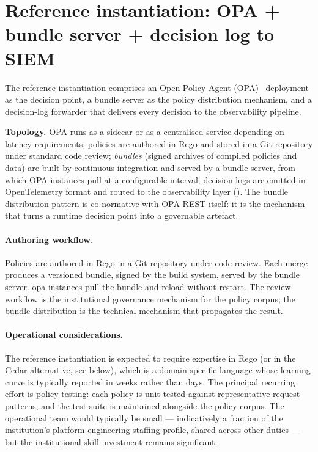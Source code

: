 \section{Reference instantiation: OPA + bundle server + decision log to SIEM}
\label{sec:po-reference}

The reference instantiation comprises an Open Policy Agent
(OPA)~\cite{opa-project}
deployment as the decision point, a bundle server as the policy
distribution mechanism, and a decision-log forwarder that delivers
every decision to the observability pipeline.

\begin{instantiationbox}
\noindent\textbf{Topology.} OPA runs as a sidecar or as a centralised
service depending on latency requirements; policies are authored in
Rego and stored in a Git repository under standard code review;
\emph{bundles} (signed archives of compiled policies and data) are
built by continuous integration and served by a bundle server, from
which OPA instances pull at a configurable interval; decision logs
are emitted in OpenTelemetry format and routed to the observability
layer (). The bundle distribution pattern
is co-normative with OPA REST itself: it is the mechanism that turns
a runtime decision point into a governable artefact.
\end{instantiationbox}

\paragraph{Authoring workflow.} Policies are authored in Rego in a
Git repository under code review. Each merge produces a versioned
bundle, signed by the build system, served by the bundle server.
\gls{opa} instances pull the bundle and reload without restart. The
review workflow is the institutional governance mechanism for the
policy corpus; the bundle distribution is the technical mechanism
that propagates the result.

\paragraph{Operational considerations.} The reference instantiation
is expected to require expertise in Rego (or in the Cedar
alternative, see below), which is a domain-specific language whose
learning curve is typically reported in weeks rather than days. The
principal recurring effort is policy testing: each policy is
unit-tested against representative request patterns, and the test
suite is maintained alongside the policy corpus. The operational
team would typically be small --- indicatively a fraction of the
institution's platform-engineering staffing profile, shared across
other duties --- but the
institutional skill investment remains significant.

